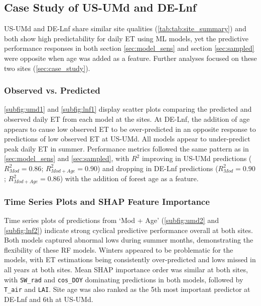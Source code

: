 \subsection{Case Study of US-UMd and DE-Lnf}
US-UMd and DE-Lnf share similar site qualities (\autoref{tab:tab:site_summary}) and both show high predictability for daily \ac{ET} using ML models, yet the predictive performance responses in both section \ref{sec:model_sens} and section \ref{sec:sampled} were opposite when age was added as a feature. Further analyses focused on these two sites (\ref{sec:case_study}).

\subsubsection{Observed vs. Predicted}\label{sec:obs}
\par \autoref{subfig:umd1} and \autoref{subfig:lnf1} display scatter plots comparing the predicted and observed daily \ac{ET} from each model at the sites. At DE-Lnf, the addition of age appears to cause low observed \ac{ET} to be over-predicted in an opposite response to predictions of low observed \ac{ET} at US-UMd. All models appear to under-predict peak daily \ac{ET} in summer. Performance metrics followed the same pattern as in \ref{sec:model_sens} and \ref{sec:sampled}, with $R^2$ improving in US-UMd predictions ($R^2_{Mod} = 0.86$; $R^2_{Mod + Age} = 0.90$) and dropping in DE-Lnf predictions ($R^2_{Mod} = 0.90$; $R^2_{Mod + Age} = 0.86$) with the addition of forest age as a feature. 

\subsubsection{Time Series Plots and SHAP Feature Importance} \label{sec:obs2}
\par Time series plots of predictions from `Mod + Age' (\autoref{subfig:umd2} and \autoref{subfig:lnf2}) indicate strong cyclical predictive performance overall at both sites. Both models captured abnormal lows during summer months, demonstrating the flexibility of these \ac{RF} models. Winters appeared to be problematic for the models, with \ac{ET} estimations being consistently over-predicted and lows missed in all years at both sites. Mean \ac{SHAP} importance order was similar at both sites, with \texttt{SW\_rad} and \texttt{cos\_DOY} dominating predictions in both models, followed by \texttt{T\_air} and \texttt{LAI}. Site age was also ranked as the 5th most important predictor at DE-Lnf and 6th at US-UMd.

